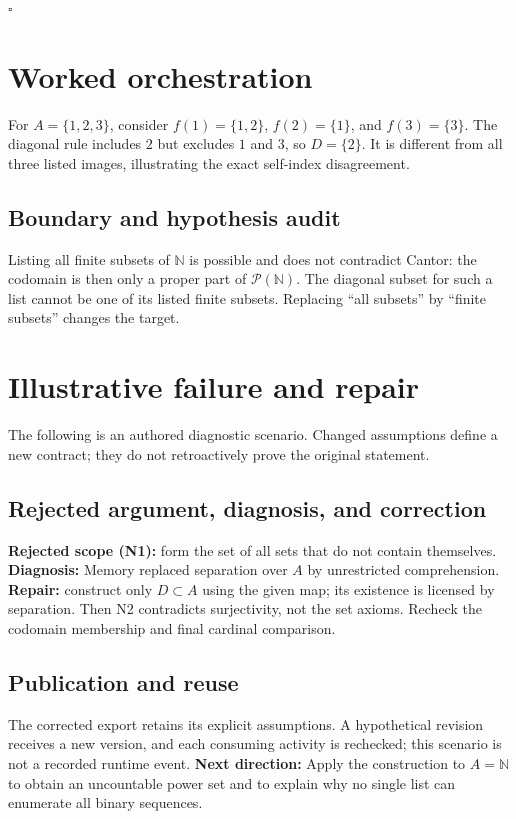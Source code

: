 \documentclass[preprint,12pt,aps,pra,showkeys,amsmath,amssymb,superscriptaddress,floatfix]{revtex4-2}
\theoremstyle{definition}
\theoremstyle{remark}
\begin{document}
\hfill$\square$

\section{Worked orchestration}

For \(A=\{1,2,3\}\), consider \(f(1)=\{1,2\}\), \(f(2)=\{1\}\), and
\(f(3)=\{3\}\). The diagonal rule includes \(2\) but excludes \(1\) and
\(3\), so \(D=\{2\}\). It is different from all three listed images,
illustrating the exact self-index disagreement.

\subsection{Boundary and hypothesis audit}

Listing all finite subsets of \(\mathbb N\) is possible and does not
contradict Cantor: the codomain is then only a proper part of
\(\mathcal P(\mathbb N)\). The diagonal subset for such a list cannot be
one of its listed finite subsets. Replacing ``all subsets'' by ``finite
subsets'' changes the target.

\section{Illustrative failure and repair}

The following is an authored diagnostic scenario. Changed assumptions
define a new contract; they do not retroactively prove the original
statement.

\subsection{Rejected argument, diagnosis, and correction}
\textbf{Rejected scope (N1):} form the set of all sets that do not
contain themselves. \textbf{Diagnosis:} Memory replaced separation over
\(A\) by unrestricted comprehension. \textbf{Repair:} construct only
\(D\subset A\) using the given map; its existence is licensed by
separation. Then N2 contradicts surjectivity, not the set axioms.
Recheck the codomain membership and final cardinal comparison.

\subsection{Publication and reuse}
The corrected export retains its explicit assumptions. A hypothetical
revision receives a new version, and each consuming activity is
rechecked; this scenario is not a recorded runtime event. \textbf{Next
direction:} Apply the construction to \(A=\mathbb N\) to obtain an
uncountable power set and to explain why no single list can enumerate
all binary sequences.
\end{document}
